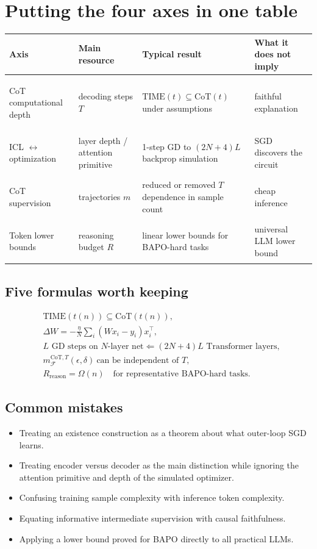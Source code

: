 \documentclass[11pt,a4paper,oneside,openany]{memoir}
\theoremstyle{definition}
\begin{document}
\chapter{Putting the four axes in one table}
\begin{center}\small
\begin{tabularx}{\textwidth}{>{\bfseries\raggedright\arraybackslash}p{}XXX}
\toprule
Axis & Main resource & Typical result & What it does not imply\\
\midrule
CoT computational depth & decoding steps $T$ & $\mathrm{TIME}(t)\subseteq\mathrm{CoT}(t)$ under assumptions & faithful explanation\\
ICL $\leftrightarrow$ optimization & layer depth / attention primitive & 1-step GD to $(2N+4)L$ backprop simulation & SGD discovers the circuit\\
CoT supervision & trajectories $m$ & reduced or removed $T$ dependence in sample count & cheap inference\\
Token lower bounds & reasoning budget $R$ & linear lower bounds for BAPO-hard tasks & universal LLM lower bound\\
\bottomrule
\end{tabularx}
\end{center}

\section{Five formulas worth keeping}
\begin{align*}
&\mathrm{TIME}(t(n))\subseteq\mathrm{CoT}(t(n)),\\
&\Delta W=-\frac\eta N\sum_i(Wx_i-y_i)x_i^\top,\\
&\text{$L$ GD steps on $N$-layer net}\Longleftarrow(2N+4)L\text{ Transformer layers},\\
&m^{\mathrm{CoT},T}_{\mathcal F}(\epsilon,\delta)\ \text{can be independent of }T,\\
&R_{\mathrm{reason}}=\Omega(n)\quad\text{for representative BAPO-hard tasks}.
\end{align*}

\section{Common mistakes}
\begin{itemize}
\item Treating an existence construction as a theorem about what outer-loop SGD learns.
\item Treating encoder versus decoder as the main distinction while ignoring the attention primitive and depth of the simulated optimizer.
\item Confusing training sample complexity with inference token complexity.
\item Equating informative intermediate supervision with causal faithfulness.
\item Applying a lower bound proved for BAPO directly to all practical LLMs.
\end{itemize}
\end{document}
